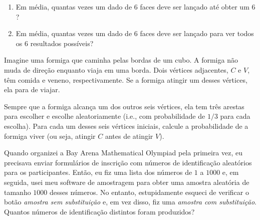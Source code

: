 \documentclass[10pt, a4paper]{article}
\begin{document}
	\begin{prob}
		\begin{enumerate}[label = (\alph*)]
			\item Em média, quantas vezes um dado de $6$ faces deve ser lançado até obter um $6$?
			\item Em média, quantas vezes um dado de $6$ faces deve ser lançado para ver todos os $6$ resultados possíveis?
		\end{enumerate}
	\end{prob}

	\begin{prob}
		Imagine uma formiga que caminha pelas bordas de um cubo. A formiga não muda de direção enquanto viaja em uma borda. Dois vértices adjacentes, $C$ e $V$, têm comida e veneno, respectivamente. Se a formiga atingir um desses vértices, ela para de viajar.

Sempre que a formiga alcança um dos outros seis vértices, ela tem três arestas para escolher e escolhe aleatoriamente (i.e., com probabilidade de $1/3$ para cada escolha). Para cada um desses seis vértices iniciais, calcule a probabilidade de a formiga viver (ou seja, atingir $C$ antes de atingir $V$).
	\end{prob}

	\begin{prob}
		Quando organizei a Bay Arena Mathematical Olympiad pela primeira vez, eu precisava enviar formulários de inscrição com números de identificação aleatórios para os participantes. Então, eu fiz uma lista dos números de $1$ a $1000$ e, em seguida, usei meu software de amostragem para obter uma amostra aleatória de tamanho $1000$ desses números. No entanto, estupidamente esqueci de verificar o botão \emph{amostra sem substituição} e, em vez disso, fiz uma \emph{amostra com substituição}. Quantos números de identificação distintos foram produzidos?
	\end{prob}
\end{document}
